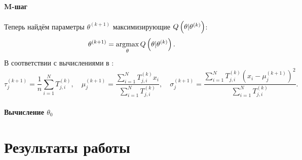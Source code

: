 \documentclass[a4paper,10pt]{article}
\DeclareMathOperator*{\argmax}{\arg\!\max}
\begin{document}
\paragraph*{M-шаг}%
Теперь найдём параметры $\theta^{(k+1)}$ максимизирующие 
$Q\del{\theta \vert \theta^{(k)}}$:
$$
\theta^{(k+1)} = \argmax\limits_{\theta} Q\del{\theta \vert \theta^{(k)}}.
$$
В соответствии с вычислениями в \cite{wiki:em-algorithm}:
$$
\tau_j^{(k+1)} = \frac{1}{n} \sum\limits_{i=1}^{N} T_{j,i}^{(k)},\quad
\mu_j^{(k+1)} = \frac
  {\sum\limits_{i=1}^{N} T_{j,i}^{(k)} x_i}
  {\sum\limits_{i=1}^{N} T_{j,i}^{(k)}},\quad
\sigma_j^{(k+1)} = \frac
  {\sum\limits_{i=1}^{N} T_{j,i}^{(k)} (x_i - \mu_j^{(k+1)})^2}
  {\sum\limits_{i=1}^{N} T_{j,i}^{(k)}}.
$$

\paragraph*{Вычисление $\theta_0$}


\section{Результаты работы}




\pagebreak



\end{document}
